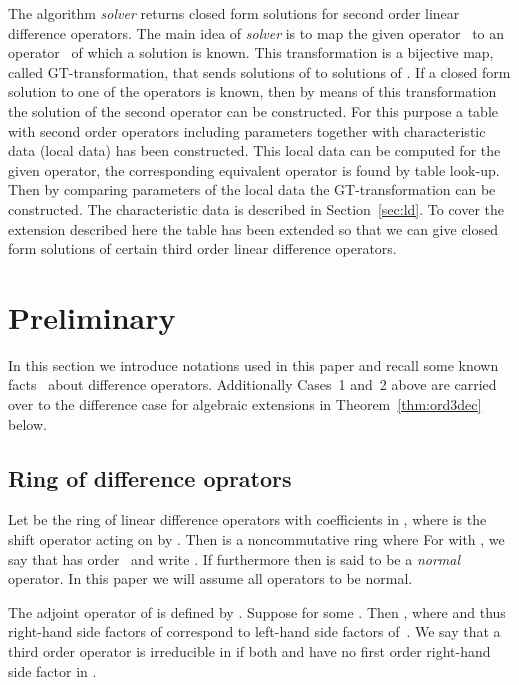 \documentclass{article}
\begin{document}
The algorithm {\em solver} returns closed form solutions for second order linear
difference operators. The main idea of {\em solver} is to map the given operator~ to
an operator~ of which a solution is known. This transformation is a bijective map,
called GT-transformation, that sends solutions of  to solutions of . If a closed
form solution to one of the operators is known, then by means of this transformation the
solution of the second operator can be constructed. For this purpose a table with
second order operators including parameters together with characteristic data (local data)
has been constructed. This local data can be computed for the given operator, the
corresponding equivalent operator is found by table look-up. Then by comparing parameters
of the local data the GT-transformation can be constructed. The characteristic data is
described in Section~\ref{sec:ld}. To cover the extension described here the table has been extended 
so that we can give closed form solutions of certain third order linear difference operators.











\section{Preliminary}
In this section we introduce notations used in this paper and recall some known
facts~\cite{CH09, CHG10, AeqB, PS97} about difference operators. Additionally Cases~1
and~2 above are carried over to the difference case for algebraic extensions in
Theorem~\ref{thm:ord3dec} below.

\subsection{Ring of difference oprators}
Let  be the ring of linear difference operators with coefficients in , where  is the shift
operator acting on  by . Then  is a noncommutative ring where  For  with , we
say that  has order~ and write . If furthermore  then  is
said to be a {\em normal} operator.  In this paper we will assume all operators to be
normal.

The adjoint operator of  is defined by .
Suppose  for some .  Then , where  and thus right-hand side factors of 
correspond to left-hand side factors of~. We say that a third order operator  is
irreducible in  if both  and  have no first order right-hand side factor in .
\end{document}
